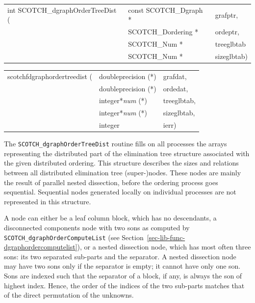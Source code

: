 \begin{itemize}
\progsyn

{\tt\begin{tabular}{l@{}ll}
int SCOTCH\_dgraphOrderTreeDist ( & const SCOTCH\_Dgraph * & grafptr,   \\
                                  & SCOTCH\_Dordering *    & ordeptr,   \\
                                  & SCOTCH\_Num *          & treeglbtab \\
                                  & SCOTCH\_Num *          & sizeglbtab)
\end{tabular}}

{\tt\begin{tabular}{l@{}ll}
scotchfdgraphordertreedist ( & doubleprecision (*)   & grafdat,    \\
                             & doubleprecision (*)   & ordedat,    \\
                             & integer*{\it num} (*) & treeglbtab, \\
                             & integer*{\it num} (*) & sizeglbtab, \\
                             & integer               & ierr)
\end{tabular}}

\progdes

The {\tt SCOTCH\_dgraphOrderTreeDist} routine fills on all processes
the arrays representing the distributed part of the elimination tree
structure associated with the given distributed ordering. This structure
describes the sizes and relations between all distributed elimination
tree (super-)nodes. These nodes are mainly the result of parallel
nested dissection, before the ordering process goes sequential.
Sequential nodes generated locally on individual processes are not
represented in this structure.

A node can either be a leaf column block, which has no descendants, a
disconnected components node with two sons as computed by
\texttt{SCOTCH\_\lbt dgraph\lbt Order\lbt Compute\lbt List} (see
Section~\ref{sec-lib-func-dgraphordercomputelist}), or a nested
dissection node, which has most often three sons: its two separated
sub-parts and the separator. A nested dissection node may have two
sons only if the separator is empty; it cannot have only one son.
Sons are indexed such that the separator of a block, if any, is always
the son of highest index. Hence, the order of the indices of the two
sub-parts matches that of the direct permutation of the unknowns.


\end{itemize}

